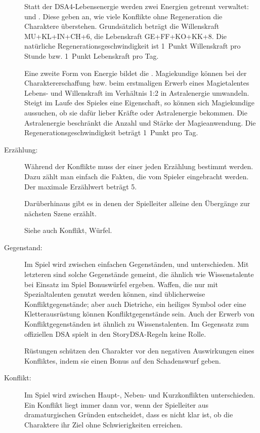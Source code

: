 \begin{description}
Statt der DSA4-Lebensenergie werden zwei Energien getrennt verwaltet:  und . Diese geben an, wie viele Konflikte ohne Regeneration die Charaktere überstehen. Grundsätzlich beträgt die Willenskraft MU+KL+IN+CH+6, die Lebenskraft GE+FF+KO+KK+8. Die natürliche Regenerationsgeschwindigkeit ist 1~Punkt Willenskraft pro Stunde bzw. 1~Punkt Lebenskraft pro Tag.

Eine zweite Form von Energie bildet die . Magiekundige können bei der Charaktererschaffung bzw. beim erstmaligen Erwerb eines Magietalentes Lebens- und Willenskraft im Verhältnis 1:2 in Astralenergie umwandeln. Steigt im Laufe des Spieles eine Eigenschaft, so können sich Magiekundige aussuchen, ob sie dafür lieber Kräfte oder Astralenergie bekommen. Die Astralenergie beschränkt die Anzahl und Stärke der Magieanwendung. Die Regenerationsgeschwindigkeit beträgt 1~Punkt pro Tag.

\item[Erzählung:] Während der Konflikte muss der  einer jeden Erzählung bestimmt werden. Dazu zählt man einfach die Fakten, die vom Spieler eingebracht werden. Der maximale Erzählwert beträgt 5.

Darüberhinaus gibt es  in denen der Spielleiter alleine den Übergänge zur nächsten Szene erzählt.

Siehe auch Konflikt, Würfel.

\item[Gegenstand:] Im Spiel wird zwischen einfachen Gegenständen,  und  unterschieden. Mit letzteren sind solche Gegenstände gemeint, die ähnlich wie Wissenstalente bei Einsatz im Spiel Bonuswürfel ergeben. Waffen, die nur mit Spezialtalenten genutzt werden können, sind üblicherweise Konfliktgegenstände; aber auch Dietriche, ein heiliges Symbol oder eine Kletterausrüstung können Konfliktgegenstände sein. Auch der Erwerb von Konfliktgegenständen ist ähnlich zu Wissenstalenten. Im Gegensatz zum offiziellen DSA spielt  in den StoryDSA-Regeln keine Rolle.

Rüstungen schützen den Charakter vor den negativen Auswirkungen eines Konfliktes, indem sie einen Bonus auf den Schadenswurf geben.

\item[Konflikt:] Im Spiel wird zwischen Haupt-, Neben- und Kurzkonflikten unterschieden. Ein Konflikt liegt immer dann vor, wenn der Spielleiter aus dramaturgischen Gründen entscheidet, dass es nicht klar ist, ob die Charaktere ihr Ziel ohne Schwierigkeiten erreichen.


\end{description}
